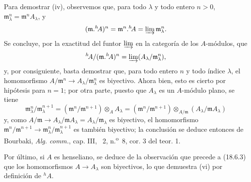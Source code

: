 Para demostrar (iv), observemos que, para todo $\lambda$ y todo entero $n>0$, $\mathfrak m_\lambda^n=\mathfrak m^nA_\lambda$, y
\[
  (\mathfrak m.{}^h\!A)^n=\mathfrak m^n.{}^h\!A=\varinjlim\mathfrak m_\lambda^n.
\]
Se concluye, por la exactitud del funtor $\varinjlim$ en la categoría de los $A$-módulos, que
\[
  {}^h\!A/(\mathfrak m.{}^h\!A)^n=\varinjlim(A_\lambda/\mathfrak m_\lambda^n),
\]
y, por consiguiente, basta demostrar que, para todo entero $n$ y todo índice $\lambda$, el homomorfismo $A/\mathfrak m^n\to A_\lambda/\mathfrak m_\lambda^n$ es biyectivo. Ahora bien, esto es cierto por hipótesis para $n=1$; por otra parte, puesto que $A_\lambda$ es un $A$-módulo plano, se tiene
\[
  \mathfrak m_\lambda^n/\mathfrak m_\lambda^{n+1}
  =(\mathfrak m^n/\mathfrak m^{n+1})\otimes_A A_\lambda
  =(\mathfrak m^n/\mathfrak m^{n+1})\otimes_{A/\mathfrak m}(A_\lambda/\mathfrak mA_\lambda)
\]
y, como $A/\mathfrak m\to A_\lambda/\mathfrak mA_\lambda=A_\lambda/\mathfrak m_\lambda$ es biyectivo, el homomorfismo $\mathfrak m^n/\mathfrak m^{n+1}\to\mathfrak m_\lambda^n/\mathfrak m_\lambda^{n+1}$ es también biyectivo; la conclusión se deduce entonces de Bourbaki, \emph{Alg. comm.}, cap. III, \textsection~2, n.\textsuperscript{o}~8, cor. 3 del teor. 1.

Por último, si $A$ es henseliano, se deduce de la observación que precede a (18.6.3) que los homomorfismos $A\to A_\lambda$ son biyectivos, lo que demuestra (vi) por definición de ${}^h\!A$.


